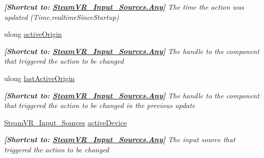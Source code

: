 \begin{DoxyCompactItemize}
\begin{DoxyCompactList}\small\item\em {\bfseries{\mbox{[}Shortcut to\+: \mbox{\hyperlink{namespace_valve_1_1_v_r_a82e5bf501cc3aa155444ee3f0662853faed36a1ef76a59ee3f15180e0441188ad}{Steam\+V\+R\+\_\+\+Input\+\_\+\+Sources.\+Any}}\mbox{]}}} The time the action was updated (Time.\+realtime\+Since\+Startup) \end{DoxyCompactList}\item 
ulong \mbox{\hyperlink{class_valve_1_1_v_r_1_1_steam_v_r___action___in_a78f3e5c201024521dd7f575617f58244}{active\+Origin}}
\begin{DoxyCompactList}\small\item\em {\bfseries{\mbox{[}Shortcut to\+: \mbox{\hyperlink{namespace_valve_1_1_v_r_a82e5bf501cc3aa155444ee3f0662853faed36a1ef76a59ee3f15180e0441188ad}{Steam\+V\+R\+\_\+\+Input\+\_\+\+Sources.\+Any}}\mbox{]}}} The handle to the component that triggered the action to be changed \end{DoxyCompactList}\item 
ulong \mbox{\hyperlink{class_valve_1_1_v_r_1_1_steam_v_r___action___in_a0c9642e77bd7d7889df24be40da84e41}{last\+Active\+Origin}}
\begin{DoxyCompactList}\small\item\em {\bfseries{\mbox{[}Shortcut to\+: \mbox{\hyperlink{namespace_valve_1_1_v_r_a82e5bf501cc3aa155444ee3f0662853faed36a1ef76a59ee3f15180e0441188ad}{Steam\+V\+R\+\_\+\+Input\+\_\+\+Sources.\+Any}}\mbox{]}}} The handle to the component that triggered the action to be changed in the previous update \end{DoxyCompactList}\item 
\mbox{\hyperlink{namespace_valve_1_1_v_r_a82e5bf501cc3aa155444ee3f0662853f}{Steam\+V\+R\+\_\+\+Input\+\_\+\+Sources}} \mbox{\hyperlink{class_valve_1_1_v_r_1_1_steam_v_r___action___in_a5bb4f52dca76a5fda6f9977d787c0402}{active\+Device}}
\begin{DoxyCompactList}\small\item\em {\bfseries{\mbox{[}Shortcut to\+: \mbox{\hyperlink{namespace_valve_1_1_v_r_a82e5bf501cc3aa155444ee3f0662853faed36a1ef76a59ee3f15180e0441188ad}{Steam\+V\+R\+\_\+\+Input\+\_\+\+Sources.\+Any}}\mbox{]}}} The input source that triggered the action to be changed \end{DoxyCompactList}\item 

\end{DoxyCompactItemize}
